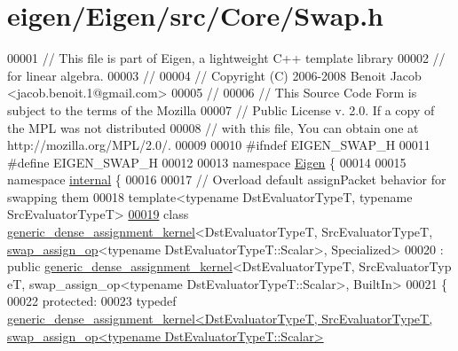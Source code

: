 \hypertarget{eigen_2_eigen_2src_2_core_2_swap_8h_source}{}\section{eigen/\+Eigen/src/\+Core/\+Swap.h}
\label{eigen_2_eigen_2src_2_core_2_swap_8h_source}

\begin{DoxyCode}
00001 \textcolor{comment}{// This file is part of Eigen, a lightweight C++ template library}
00002 \textcolor{comment}{// for linear algebra.}
00003 \textcolor{comment}{//}
00004 \textcolor{comment}{// Copyright (C) 2006-2008 Benoit Jacob <jacob.benoit.1@gmail.com>}
00005 \textcolor{comment}{//}
00006 \textcolor{comment}{// This Source Code Form is subject to the terms of the Mozilla}
00007 \textcolor{comment}{// Public License v. 2.0. If a copy of the MPL was not distributed}
00008 \textcolor{comment}{// with this file, You can obtain one at http://mozilla.org/MPL/2.0/.}
00009 
00010 \textcolor{preprocessor}{#ifndef EIGEN\_SWAP\_H}
00011 \textcolor{preprocessor}{#define EIGEN\_SWAP\_H}
00012 
00013 \textcolor{keyword}{namespace }\hyperlink{namespace_eigen}{Eigen} \{ 
00014 
00015 \textcolor{keyword}{namespace }\hyperlink{namespaceinternal}{internal} \{
00016 
00017 \textcolor{comment}{// Overload default assignPacket behavior for swapping them}
00018 \textcolor{keyword}{template}<\textcolor{keyword}{typename} DstEvaluatorTypeT, \textcolor{keyword}{typename} SrcEvaluatorTypeT>
\hyperlink{class_eigen_1_1internal_1_1generic__dense__assignment__kernel_3_01_dst_evaluator_type_t_00_01_sr759181e846694beea0b332c7e3bbe519}{00019} \textcolor{keyword}{class }\hyperlink{class_eigen_1_1internal_1_1generic__dense__assignment__kernel}{generic\_dense\_assignment\_kernel}<DstEvaluatorTypeT, SrcEvaluatorTypeT, 
      \hyperlink{struct_eigen_1_1internal_1_1swap__assign__op}{swap\_assign\_op}<typename DstEvaluatorTypeT::Scalar>, Specialized>
00020  : \textcolor{keyword}{public} \hyperlink{class_eigen_1_1internal_1_1generic__dense__assignment__kernel}{generic\_dense\_assignment\_kernel}<DstEvaluatorTypeT, SrcEvaluatorTyp
      eT, swap\_assign\_op<typename DstEvaluatorTypeT::Scalar>, BuiltIn>
00021 \{
00022 \textcolor{keyword}{protected}:
00023   \textcolor{keyword}{typedef} 
      \hyperlink{class_eigen_1_1internal_1_1generic__dense__assignment__kernel}{generic\_dense\_assignment\_kernel<DstEvaluatorTypeT, SrcEvaluatorTypeT, swap\_assign\_op<typename
       DstEvaluatorTypeT::Scalar>}

\end{DoxyCode}
